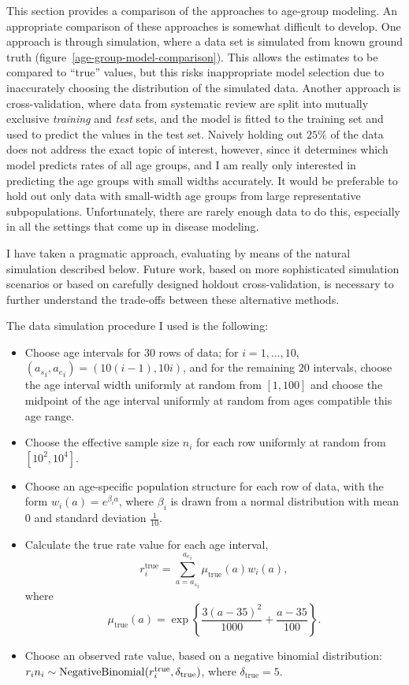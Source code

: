 This section provides a comparison of the approaches to age-group
modeling.  An appropriate comparison of these approaches is somewhat difficult to
develop.  One approach is through simulation, where a data set is
simulated from known ground truth (figure~\ref{age-group-model-comparison}).
This allows the estimates to be
compared to ``true'' values, but this risks
inappropriate model selection due to inaccurately choosing the
distribution of the simulated data.  Another approach is
cross-validation, where data from systematic review are split into
mutually exclusive
\emph{training} and \emph{test} sets, and the model is fitted to the
training set and used to predict the values in the test set.  Naively
holding out $25\%$ of the data does not address the exact topic of
interest, however, since it determines which model predicts rates of
all age groups, and I am really only interested in predicting the age groups
with small widths accurately.  It would be preferable to hold
out only data with small-width age groups from large representative
subpopulations.  Unfortunately, there are rarely enough data to do this,
especially in all the settings that come up in disease modeling.

I have taken a pragmatic approach, evaluating by means of the natural
simulation described below.  Future work, based on more sophisticated
simulation scenarios or based on carefully designed holdout
cross-validation, is necessary to further understand the trade-offs
between these alternative methods.

The data simulation procedure I used is the following:
\begin{itemize}
\item Choose age intervals for $30$ rows of data; for $i=1,\ldots,10$,
  $({a_s}_i,{a_e}_i) = (10(i-1), 10i)$, and for the remaining $20$
  intervals, choose the age interval width uniformly at random from $[1,100]$
  and choose the midpoint of the age interval uniformly at random from ages
  compatible this age range.

\item Choose the effective sample size $n_i$ for each row uniformly at random from $[10^2, 10^4]$.

\item Choose an age-specific population structure for each row of data,
  with the form $w_i(a) = e^{\beta_i a}$, where $\beta_i$ is drawn
  from a normal distribution with mean $0$ and standard deviation
  $\frac{1}{10}$.

\item Calculate the true rate value for each age interval,
  \[ r^\text{true}_i = \sum_{a={a_s}_i}^{{a_e}_i} \mu_\text{true}(a)
  w_i(a),\] where \[ \mu_\text{true}(a) =
  \exp\left\{\frac{3(a-35)^2}{1000} + \frac{a-35}{100}\right\}. \]

\item Choose an observed rate value, based on a negative binomial distribution:
$r_in_i \sim \operatorname{NegativeBinomial}(r^\text{true}_i, \delta_\text{true})$, where $\delta_\text{true} = 5$.
\end{itemize}

